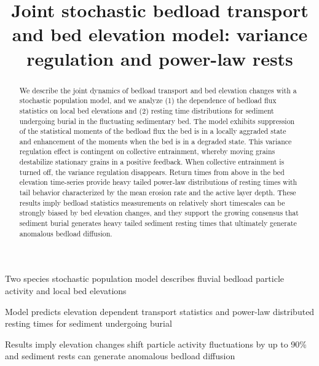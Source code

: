 \documentclass[draft]{agujournal2018}
\begin{document}
\title{Joint stochastic bedload transport and bed elevation model: variance regulation and power-law rests}

\begin{keypoints}
\item Two species stochastic population model describes fluvial bedload particle activity and local bed elevations
\item Model predicts elevation dependent transport statistics and power-law distributed resting times for sediment undergoing burial
\item Results imply elevation changes shift particle activity fluctuations by up to 90\% and sediment rests can generate anomalous bedload diffusion
\end{keypoints}

\begin{abstract}
We describe the joint dynamics of bedload transport and bed elevation changes with a stochastic population model, and we analyze (1) the dependence of bedload flux statistics on local bed elevations and (2) resting time distributions for sediment undergoing burial in the fluctuating sedimentary bed.
The model exhibits suppression of the statistical moments of the bedload flux the bed is in a locally aggraded state and enhancement of the moments when the bed is in a degraded state.
This variance regulation effect is contingent on collective entrainment, whereby moving grains destabilize stationary grains in a positive feedback. 
When collective entrainment is turned off, the variance regulation disappears.
Return times from above in the bed elevation time-series provide heavy tailed power-law distributions of resting times with tail behavior characterized by the mean erosion rate and the active layer depth.
These results imply bedload statistics measurements on relatively short timescales can be strongly biased by bed elevation changes, and they support the growing consensus that sediment burial generates heavy tailed sediment resting times that ultimately generate anomalous bedload diffusion.
\end{abstract} 
\end{document}
